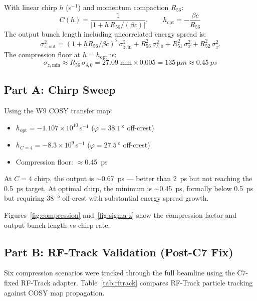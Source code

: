 \documentclass[11pt]{article}
\begin{document}
With linear chirp $h$ (s$^{-1}$) and momentum compaction $R_{56}$:
\begin{equation}
  C(h) = \frac{1}{|1 + h\,R_{56}/(\beta c)|}, \qquad
  h_\text{opt} = -\frac{\beta c}{R_{56}}
  \label{eq:compression}
\end{equation}
The output bunch length including uncorrelated energy spread is:
\begin{equation}
  \sigma_{z,\text{out}}^2 = (1 + h R_{56}/\beta c)^2\,\sigma_{z,\text{in}}^2
    + R_{56}^2\,\sigma_{\delta,0}^2
    + R_{51}^2\,\sigma_x^2 + R_{52}^2\,\sigma_{x'}^2
  \label{eq:sigma-z-full}
\end{equation}
The compression floor at $h = h_\text{opt}$ is:
\begin{equation}
  \sigma_{z,\text{min}} \approx R_{56}\,\sigma_{\delta,0}
    = 27.09\;\text{mm} \times 0.005 = \SI{135}{\micro m}
    \approx \SI{0.45}{ps}
  \label{eq:floor}
\end{equation}

\subsection{Part A: Chirp Sweep}

Using the W9 COSY transfer map:
\begin{itemize}
  \item $h_\text{opt} = -1.107 \times 10^{10}$\,s$^{-1}$
    ($\varphi = \SI{38.1}{\degree}$ off-crest)
  \item $h_{C=4} = -8.3 \times 10^{9}$\,s$^{-1}$
    ($\varphi = \SI{27.5}{\degree}$ off-crest)
  \item Compression floor: $\approx$\SI{0.45}{ps}
\end{itemize}

At $C = 4$ chirp, the output is $\sim$\SI{0.67}{ps} --- better than
\SI{2}{ps} but not reaching the \SI{0.5}{ps} target.  At optimal
chirp, the minimum is $\sim$\SI{0.45}{ps}, formally below \SI{0.5}{ps}
but requiring \SI{38}{\degree} off-crest with substantial energy spread
growth.

Figures~\ref{fig:compression} and~\ref{fig:sigma-z} show the
compression factor and output bunch length vs chirp rate.


\subsection{Part B: RF-Track Validation (Post-C7 Fix)}

Six compression scenarios were tracked through the full beamline
using the C7-fixed RF-Track adapter.  Table~\ref{tab:rftrack}
compares RF-Track particle tracking against COSY map propagation.
\end{document}
